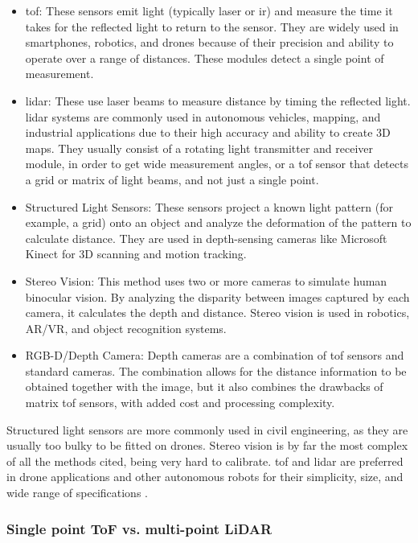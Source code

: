 \begin{itemize}
  \item \gls{tof}: These sensors emit light (typically laser or \gls{ir}) and measure
  the time it takes for the reflected light to return to the sensor. They are widely used in
  smartphones, robotics, and drones because of their precision and ability to operate over a range
  of distances. These modules detect a single point of measurement.
  \item \gls{lidar}: These use laser beams to measure distance by timing the
  reflected light. \gls{lidar} systems are commonly used in autonomous vehicles, mapping, and industrial
  applications due to their high accuracy and ability to create 3D maps. They usually consist of a rotating
  light transmitter and receiver module, in order to get wide measurement angles, or a \gls{tof}
  sensor that detects a grid or matrix of light beams, and not just a single point.
  \item Structured Light Sensors: These sensors project a known light pattern (for example, a grid)
  onto an object and analyze the deformation of the pattern to calculate distance. They are used in
  depth-sensing cameras like Microsoft Kinect for 3D scanning and motion tracking.
  \item Stereo Vision: This method uses two or more cameras to simulate human binocular vision.
  By analyzing the disparity between images captured by each camera, it calculates the depth and distance.
  Stereo vision is used in robotics, AR/VR, and object recognition systems.
  \item RGB-D/Depth Camera: Depth cameras are a combination of \gls{tof} sensors and standard cameras.
  The combination allows for the distance information to be obtained together with the image, but it also
  combines the drawbacks of matrix \gls{tof} sensors, with added cost and processing complexity.
\end{itemize}

Structured light sensors are more commonly used in civil engineering, as they are usually too
bulky to be fitted on drones. Stereo vision is by far the most complex of all the methods cited,
being very hard to calibrate. \gls{tof} and \gls{lidar} are preferred in drone applications and other
autonomous robots for their simplicity, size, and wide range of specifications \cite{dronesensors}.

\subsubsection{Single point ToF vs. multi-point LiDAR}

